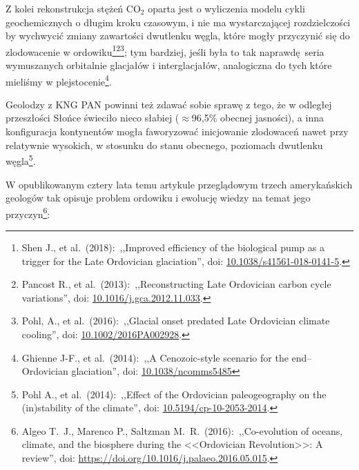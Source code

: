 \documentclass[12pt]{article}
\newcommand{\doi}[1]{doi: \href{htts://doi.org/#1}{#1}}
\begin{document}
Z kolei rekonstrukcja stężeń CO$_2$ oparta jest o wyliczenia modelu cykli geochemicznych o długim kroku czasowym, i nie ma wystarczającej rozdzielczości by wychwycić zmiany zawartości dwutlenku węgla, które mogły przyczynić się do zlodowacenie w ordowiku\footnote{Shen J., et al.~(2018):~,,Improved efficiency of the biological pump as a trigger for the Late Ordovician glaciation'', \doi{10.1038/s41561-018-0141-5}.}\footnote{Pancost R., et al.~(2013):~,,Reconstructing Late Ordovician carbon cycle variations'', \doi{10.1016/j.gca.2012.11.033}.}\footnote{Pohl, A., et al.~(2016):~,,Glacial onset predated Late Ordovician climate cooling'', \doi{10.1002/2016PA002928}.}; tym bardziej, jeśli była to tak naprawdę seria wymuszanych orbitalnie glacjałów i interglacjałów, analogiczna do tych które mieliśmy w plejstocenie\footnote{Ghienne J-F., et al.~(2014):~,,A Cenozoic-style scenario for the end--Ordovician glaciation'', \doi{10.1038/ncomms5485}}.
	
Geolodzy z KNG PAN powinni też zdawać sobie sprawę z tego, że w odległej przeszłości Słońce świeciło nieco słabiej ($\approx$96{,}5\% obecnej jasności), a inna konfiguracja kontynentów mogła faworyzować inicjowanie zlodowaceń nawet przy relatywnie wysokich, w stosunku do stanu obecnego, poziomach dwutlenku węgla\footnote{Pohl A., et al.~(2014):~,,Effect of the Ordovician paleogeography on the (in)stability of the climate'', \doi{10.5194/cp-10-2053-2014}.}.
		
W opublikowanym cztery lata temu artykule przeglądowym trzech amerykańskich geologów tak opisuje problem ordowiku i ewolucję wiedzy na temat jego przyczyn\footnote{Algeo T.~J., Marenco P., Saltzman M.~R.~(2016):~,,Co-evolution of oceans, climate, and the biosphere during the <<Ordovician Revolution>>: A review'', \doi{https://doi.org/10.1016/j.palaeo.2016.05.015}.}:
		
\end{document}
